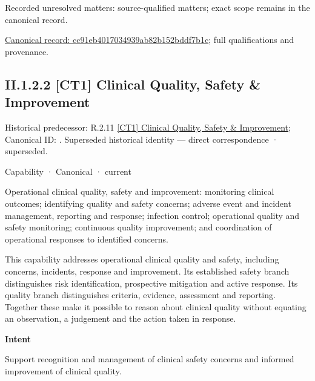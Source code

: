 {\small Recorded unresolved matters: source-qualified matters; exact scope remains in the canonical record.}\par
{\footnotesize \href{../../../../../../../continuum/strategy/capability/cc91eb4017034939ab82b152bddf7b1c.md}{Canonical record: cc91eb4017034939ab82b152bddf7b1c}; full qualifications and provenance.}\par
\subsection*{II.1.2.2 [CT1] Clinical Quality, Safety \& Improvement}
\label{navigation:II.1.2.2}

{\small Historical predecessor: R.2.11 \hyperref[element:b967c383dbcd4c24abe6a83ea5e79e00]{[CT1] Clinical Quality, Safety \& Improvement}; Canonical ID: \texttt{}. Superseded historical identity — direct correspondence · superseded.}\par
\label{element:63837bf848774572a06b935af95581a2}
{\small Capability · Canonical · current}\par

Operational clinical quality, safety and improvement: monitoring clinical outcomes; identifying quality and safety concerns; adverse event and incident management, reporting and response; infection control; operational quality and safety monitoring; continuous quality improvement; and coordination of operational responses to identified concerns.



This capability addresses operational clinical quality and safety, including concerns, incidents, response and improvement. Its established safety branch distinguishes risk identification, prospective mitigation and active response. Its quality branch distinguishes criteria, evidence, assessment and reporting. Together these make it possible to reason about clinical quality without equating an observation, a judgement and the action taken in response.



\textbf{Intent}



Support recognition and management of clinical safety concerns and informed improvement of clinical quality.



